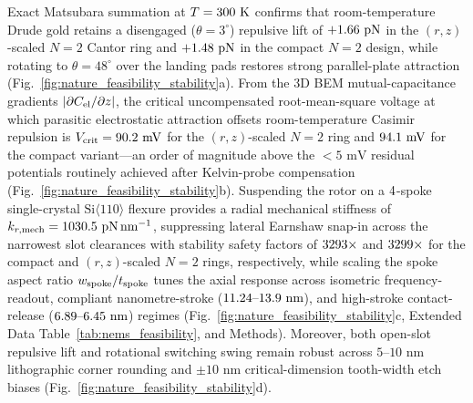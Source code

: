 \documentclass[pdflatex,sn-nature]{sn-jnl}
\DeclareRobustCommand{\roundzero}[1]{\fpeval{round(#1,0)}}
\DeclareRobustCommand{\roundone}[1]{\fpeval{round(#1,1)}}
\DeclareRobustCommand{\roundtwo}[1]{\fpeval{round(#1,2)}}
\begin{document}
Exact Matsubara summation at $T = 300{}\text{ K}$ confirms that room-temperature Drude gold retains a disengaged ($\theta=3^\circ$) repulsive lift of $+\roundtwo{\NatureCantorNtwoHybridrzPatchPotentialFCasimirGoldThreezerozerokPn}\text{ pN}$ in the $(r,z)$-scaled $N=2$ Cantor ring and $+\roundtwo{\NatureRotCeightCompactNtwoPatchPotentialFCasimirGoldThreezerozerokPn}\text{ pN}$ in the compact $N=2$ design, while rotating to $\theta=48^\circ$ over the landing pads restores strong parallel-plate attraction (Fig.~\ref{fig:nature_feasibility_stability}a). From the 3D BEM mutual-capacitance gradients $|\partial C_{\rm el}/\partial z|$, the critical uncompensated root-mean-square voltage at which parasitic electrostatic attraction offsets room-temperature Casimir repulsion is $V_{\rm crit} = \roundone{\NatureCantorNtwoHybridrzPatchPotentialVCritMv}\text{ mV}$ for the $(r,z)$-scaled $N=2$ ring and $\roundone{\NatureRotCeightCompactNtwoPatchPotentialVCritMv}\text{ mV}$ for the compact variant---an order of magnitude above the $<5\text{ mV}$ residual potentials routinely achieved after Kelvin-probe compensation (Fig.~\ref{fig:nature_feasibility_stability}b). Suspending the rotor on a $4{}$-spoke single-crystal $\text{Si}\langle 110\rangle$ flexure provides a radial mechanical stiffness of $k_{r,\rm mech} = \roundone{\NatureRotCeightCompactNtwoLateralStabilityKRMechPnPerNm}\text{ pN}\,\text{nm}^{-1}$, suppressing lateral Earnshaw snap-in across the narrowest slot clearances with stability safety factors of $\roundzero{\NatureRotCeightCompactNtwoLateralStabilityLateralStabilitySafetyFactor}\times$ and $\roundzero{\NatureCantorNtwoHybridrzLateralStabilityLateralStabilitySafetyFactor}\times$ for the compact and $(r,z)$-scaled $N=2$ rings, respectively, while scaling the spoke aspect ratio $w_{\rm spoke}/t_{\rm spoke}$ tunes the axial response across isometric frequency-readout, compliant nanometre-stroke ($\roundtwo{\NatureCantorNtwoHybridrzLateralStabilityNmActuatorPeakToPeakStrokeNm}\text{--}\roundtwo{\NatureRotCeightCompactNtwoLateralStabilityNmActuatorPeakToPeakStrokeNm}\text{ nm}$), and high-stroke contact-release ($\roundtwo{\NatureCantorNtwoHybridrzLateralStabilityCompactClutchBasinEqLiftNm}\text{--}\roundtwo{\NatureRotCeightCompactNtwoLateralStabilityCompactClutchBasinEqLiftNm}\text{ nm}$) regimes (Fig.~\ref{fig:nature_feasibility_stability}c, Extended Data Table~\ref{tab:nems_feasibility}, and Methods). Moreover, both open-slot repulsive lift and rotational switching swing remain robust across $5\text{--}10\text{ nm}$ lithographic corner rounding and $\pm 10\text{ nm}$ critical-dimension tooth-width etch biases (Fig.~\ref{fig:nature_feasibility_stability}d).
\end{document}
